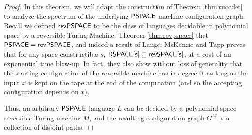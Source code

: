 \documentclass[11pt]{article}
\theoremstyle{definition}
\theoremstyle{remark}
\newcommand\PSPACE{{\sf{PSPACE}}}
\newcommand\revPSPACE{{\sf{revPSPACE}}}
\begin{document}
\begin{proof}
	In this theorem, we will adapt the construction of Theorem \ref{thm:succdet} to analyze the spectrum of the underlying $\PSPACE$ machine configuration graph.  
	 Recall we defined $\revPSPACE$ to be the class of languages decidable in polynomial space by a reversible Turing Machine.  Theorem \ref{thm:revpspace} that $\PSPACE=\revPSPACE$, and indeed a result of Lange, McKenzie and Tapp \cite{lange00} proves that for any space-constructible $s$, ${\sf{DSPACE}[s]}\subseteq{\sf{revSPACE}[s]}$, at a cost of an exponential time blow-up.  In fact, they also show without loss of generality that the starting configuration of the reversible machine has in-degree $0$, as long as the input $x$ is kept on the tape at the end of the computation (and so the accepting configuration depends on $x$).
	
	Thus, an arbitrary $\PSPACE$ language $L$ can be decided by a polynomial space reversible Turing machine $M$, and the resulting configuration graph $G^M$ is a collection of disjoint paths. 
		

\end{proof}
\end{document}
